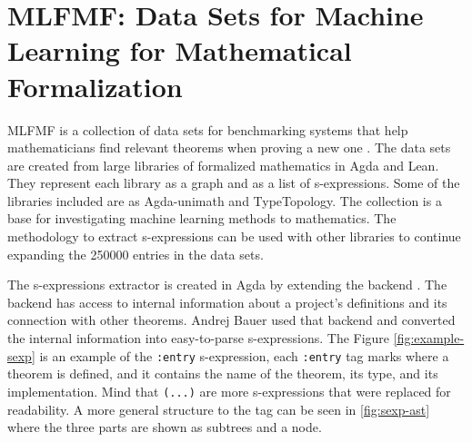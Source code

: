 \section{MLFMF: Data Sets for Machine Learning for Mathematical Formalization}

MLFMF is a collection of data sets for benchmarking systems that help
mathematicians find relevant theorems when proving a new one
\cite{bauer2023mlfmf}. The data sets are created from large libraries of
formalized mathematics in Agda and Lean. They represent each library as a graph
and as a list of s-expressions. Some of the libraries included are as
Agda-unimath and TypeTopology. The collection is a base for investigating
machine learning methods to mathematics. The methodology to extract
s-expressions can be used with other libraries to continue expanding the 250000
entries in the data sets.

The s-expressions extractor is created in Agda by extending the backend
\cite{andrej}. The backend has access to internal information about a project's
definitions and its connection with other theorems. Andrej Bauer used that
backend and converted the internal information into easy-to-parse
s-expressions. The Figure \cref{fig:example-sexp} is an example of the
\texttt{:entry} s-expression, each \texttt{:entry} tag marks where a theorem is
defined, and it contains the name of the theorem, its type, and its
implementation. Mind that \texttt{(...)} are more s-expressions that were
replaced for readability. A more general structure to the tag can be seen in
\cref{fig:sexp-ast} where the three parts are shown as subtrees and a node.

